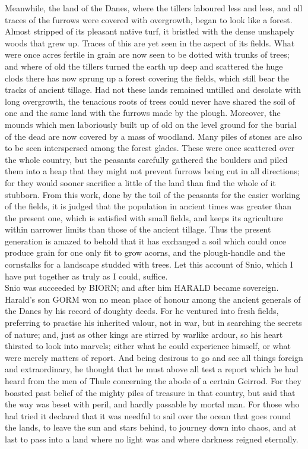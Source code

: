 \documentclass[10pt,a4paper]{report}
\begin{document}
Meanwhile, the land of the Danes, where the tillers laboured less and less, and all traces of the furrows were covered with overgrowth, began to look like a forest. Almost stripped of its pleasant native turf, it bristled with the dense unshapely woods that grew up. Traces of this are yet seen in the aspect of its fields. What were once acres fertile in grain are now seen to be dotted with trunks of trees; and where of old the tillers turned the earth up deep and scattered the huge clods there has now sprung up a forest covering the fields, which still bear the tracks of ancient tillage. Had not these lands remained untilled and desolate with long overgrowth, the tenacious roots of trees could never have shared the soil of one and the same land with the furrows made by the plough. Moreover, the mounds which men laboriously built up of old on the level ground for the burial of the dead are now covered by a mass of woodland. Many piles of stones are also to be seen interspersed among the forest glades. These were once scattered over the whole country, but the peasants carefully gathered the boulders and piled them into a heap that they might not prevent furrows being cut in all directions; for they would sooner sacrifice a little of the land than find the whole of it stubborn. From this work, done by the toil of the peasants for the easier working of the fields, it is judged that the population in ancient times was greater than the present one, which is satisfied with small fields, and keeps its agriculture within narrower limits than those of the ancient tillage. Thus the present generation is amazed to behold that it has exchanged a soil which could once produce grain for one only fit to grow acorns, and the plough-handle and the cornstalks for a landscape studded with trees. Let this account of Snio, which I have put together as truly as I could, suffice.\\

Snio was succeeded by BIORN; and after him HARALD became sovereign. Harald's son GORM won no mean place of honour among the ancient generals of the Danes by his record of doughty deeds. For he ventured into fresh fields, preferring to practise his inherited valour, not in war, but in searching the secrets of nature; and, just as other kings are stirred by warlike ardour, so his heart thirsted to look into marvels; either what he could experience himself, or what were merely matters of report. And being desirous to go and see all things foreign and extraordinary, he thought that he must above all test a report which he had heard from the men of Thule concerning the abode of a certain Geirrod. For they boasted past belief of the mighty piles of treasure in that country, but said that the way was beset with peril, and hardly passable by mortal man. For those who had tried it declared that it was needful to sail over the ocean that goes round the lands, to leave the sun and stars behind, to journey down into chaos, and at last to pass into a land where no light was and where darkness reigned eternally.\\
\end{document}
